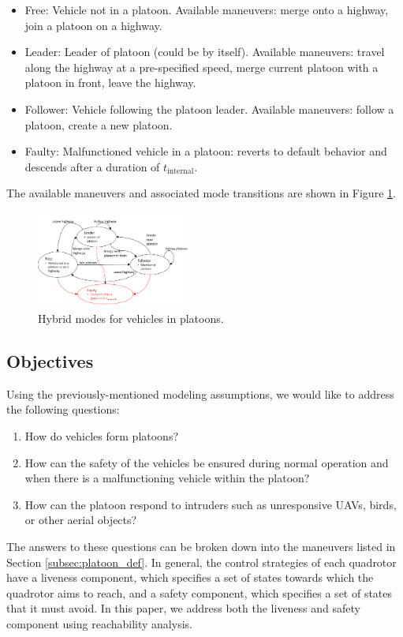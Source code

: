 \begin{itemize}
\item Free: Vehicle not in a platoon. Available maneuvers: merge onto a highway, join a platoon on a highway.
\item Leader: Leader of platoon (could be by itself). Available maneuvers: travel along the highway at a pre-specified speed, merge current platoon with a platoon in front, leave the highway.
\item Follower: Vehicle following the platoon leader. Available maneuvers: follow a platoon, create a new platoon.
\item Faulty: Malfunctioned vehicle in a platoon: reverts to default behavior and descends after a duration of $t_\text{internal}$.
\end{itemize}

The available maneuvers and associated mode transitions are shown in Figure \ref{fig:vehicleModes}.

\begin{figure}
	\centering
	\includegraphics[width=0.45\textwidth]{"fig/vehicleModes"}
	\caption{Hybrid modes for vehicles in platoons.}
	\label{fig:vehicleModes}
\end{figure}

\subsection{Objectives}
Using the previously-mentioned modeling assumptions, we would like to address the following questions:

\begin{enumerate}
\item How do vehicles form platoons?
\item How can the safety of the vehicles be ensured during normal operation and when there is a malfunctioning vehicle within the platoon?
\item How can the platoon respond to intruders such as unresponsive UAVs, birds, or other aerial objects?
\end{enumerate}

The answers to these questions can be broken down into the maneuvers listed in Section \ref{subsec:platoon_def}. In general, the control strategies of each quadrotor have a liveness component, which specifies a set of states towards which the quadrotor aims to reach, and a safety component, which specifies a set of states that it must avoid. In this paper, we address both the liveness and safety component using reachability analysis.